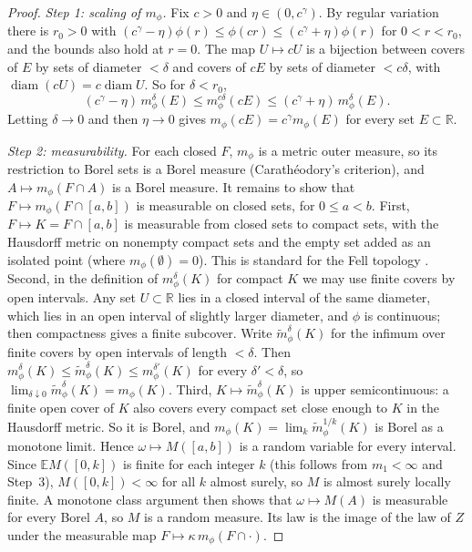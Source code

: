 \documentclass[11pt]{article}
\theoremstyle{remark}
\theoremstyle{definition}
\newcommand{\E}{\mathbb{E}}
\newcommand{\R}{\mathbb{R}}
\begin{document}
\begin{proof}
\emph{Step 1: scaling of $m_\phi$.} Fix $c>0$ and $\eta\in(0,c^\gamma)$. By regular variation there is $r_0>0$ with $(c^\gamma-\eta)\phi(r)\le\phi(cr)\le(c^\gamma+\eta)\phi(r)$ for $0<r<r_0$, and the bounds also hold at $r=0$. The map $U\mapsto cU$ is a bijection between covers of $E$ by sets of diameter $<\delta$ and covers of $cE$ by sets of diameter $<c\delta$, with $\operatorname{diam}(cU)=c\operatorname{diam}U$. So for $\delta<r_0$,
\[
(c^\gamma-\eta)\,m_\phi^\delta(E)\le m_\phi^{c\delta}(cE)\le(c^\gamma+\eta)\,m_\phi^\delta(E).
\]
Letting $\delta\to0$ and then $\eta\to0$ gives $m_\phi(cE)=c^\gamma m_\phi(E)$ for every set $E\subset\R$.

\emph{Step 2: measurability.} For each closed $F$, $m_\phi$ is a metric outer measure, so its restriction to Borel sets is a Borel measure (Carath\'eodory's criterion), and $A\mapsto m_\phi(F\cap A)$ is a Borel measure. It remains to show that $F\mapsto m_\phi(F\cap[a,b])$ is measurable on closed sets, for $0\le a<b$. First, $F\mapsto K=F\cap[a,b]$ is measurable from closed sets to compact sets, with the Hausdorff metric on nonempty compact sets and the empty set added as an isolated point (where $m_\phi(\emptyset)=0$). This is standard for the Fell topology \cite{Mat75,Mol17}. Second, in the definition of $m_\phi^\delta(K)$ for compact $K$ we may use finite covers by open intervals. Any set $U\subset\R$ lies in a closed interval of the same diameter, which lies in an open interval of slightly larger diameter, and $\phi$ is continuous; then compactness gives a finite subcover. Write $\tilde m^\delta_\phi(K)$ for the infimum over finite covers by open intervals of length $<\delta$. Then $m^\delta_\phi(K)\le\tilde m^\delta_\phi(K)\le m^{\delta'}_\phi(K)$ for every $\delta'<\delta$, so $\lim_{\delta\downarrow0}\tilde m^\delta_\phi(K)=m_\phi(K)$. Third, $K\mapsto\tilde m^\delta_\phi(K)$ is upper semicontinuous: a finite open cover of $K$ also covers every compact set close enough to $K$ in the Hausdorff metric. So it is Borel, and $m_\phi(K)=\lim_k\tilde m^{1/k}_\phi(K)$ is Borel as a monotone limit. Hence $\omega\mapsto M([a,b])$ is a random variable for every interval. Since $\E M([0,k])$ is finite for each integer $k$ (this follows from $m_1<\infty$ and Step~3), $M([0,k])<\infty$ for all $k$ almost surely, so $M$ is almost surely locally finite. A monotone class argument then shows that $\omega\mapsto M(A)$ is measurable for every Borel $A$, so $M$ is a random measure. Its law is the image of the law of $Z$ under the measurable map $F\mapsto\kappa\,m_\phi(F\cap\cdot)$.


\end{proof}
\end{document}
